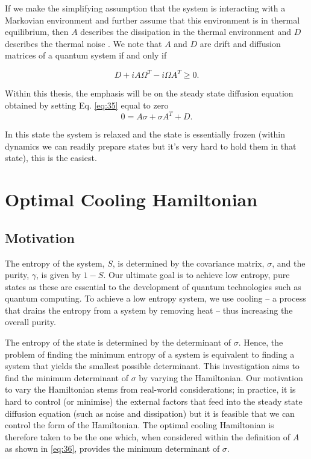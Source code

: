\documentclass[11pt,a4paper]{article}
\numberwithin{equation}{section}
\begin{document}
	If we make the simplifying assumption that the system is interacting with a Markovian environment and further assume that this environment is in thermal equilibrium, then $A$ describes the dissipation in the thermal environment and $D$ describes the thermal noise \cite{Serafini17}. We note that $A$ and $D$ are drift and diffusion matrices of a quantum system if and only if \cite{Serafini17}
	
	\begin{equation} \label{eq:37}
	D + iA \Omega^T - i\Omega A^T \geq 0.
	\end{equation}
		
	Within this thesis, the emphasis will be on the steady state diffusion equation obtained by setting Eq. \ref{eq:35} equal to zero
	\begin{equation} \label{eq:38}
	0 = A\sigma +\sigma A^{T} + D.
	\end{equation}
	
	\color{blue}In this state the system is relaxed and the state is essentially frozen (within dynamics we can readily prepare states but it's very hard to hold them in that state), this is the easiest. \color{black}
	
	\section{Optimal Cooling Hamiltonian}
	
	\subsection{Motivation}
	The entropy of the system, $S$, is determined by the covariance matrix, $\sigma$, and the purity, $\gamma$, is given by $1-S$. Our ultimate goal is to achieve low entropy, pure states as these are essential to the development of quantum technologies such as quantum computing. To achieve a low entropy system, we use cooling -- a process that drains the entropy from a system by removing heat -- thus increasing the overall purity.
	
	The entropy of the state is determined by the determinant of $\sigma$. Hence, the problem of finding the minimum entropy of a system is equivalent to finding a system that yields the smallest possible determinant. This investigation aims to find the minimum determinant of $\sigma$ by varying the Hamiltonian. Our motivation to vary the Hamiltonian stems from real-world considerations; in practice, it is hard to control (or minimise) the external factors that feed into the steady state diffusion equation (such as noise and dissipation) but it is feasible that we can control the form of the Hamiltonian. The optimal cooling Hamiltonian is therefore taken to be the one which, when considered within the definition of $A$ as shown in \ref{eq:36}, provides the minimum determinant of $\sigma$. 
	
\end{document}
